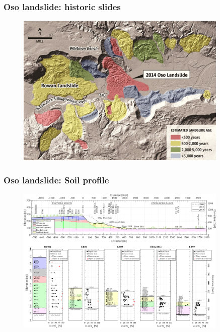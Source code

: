 \documentclass[notes]{beamer}
\begin{document}
\begin{frame}
	\frametitle{Oso landslide: historic slides}
	\begin{figure}
		\includegraphics[width=0.9\textwidth]{figs/oso/past-slides.png}
	\end{figure}
\end{frame}

\begin{frame}
	\frametitle{Oso landslide: Soil profile}
	\begin{figure}
		\includegraphics[width=0.9\textwidth]{figs/oso/soil.png}
	\end{figure}
\end{frame}
\end{document}
